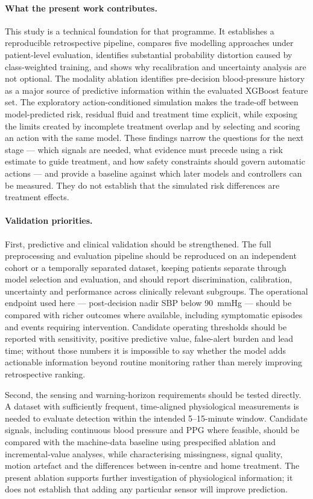 \documentclass{article}
\begin{document}
\paragraph{What the present work contributes.} This study is a technical foundation for that programme. It establishes a
reproducible retrospective pipeline, compares five modelling approaches under patient-level evaluation, identifies substantial
probability distortion caused by class-weighted training, and shows why recalibration and uncertainty analysis are not optional.
The modality ablation identifies pre-decision blood-pressure history as a major source of predictive information within the
evaluated XGBoost feature set. The exploratory action-conditioned simulation makes the trade-off between model-predicted risk,
residual fluid and treatment time explicit, while exposing the limits created by incomplete treatment overlap and by selecting
and scoring an action with the same model. These findings narrow the questions for the next stage --- which signals are needed,
what evidence must precede using a risk estimate to guide treatment, and how safety constraints should govern automatic
actions --- and provide a baseline against which later models and controllers can be measured. They do not establish that the
simulated risk differences are treatment effects.

\paragraph{Validation priorities.} First, predictive and clinical validation should be strengthened. The full preprocessing and
evaluation pipeline should be reproduced on an independent cohort or a temporally separated dataset, keeping patients separate
through model selection and evaluation, and should report discrimination, calibration, uncertainty and performance across
clinically relevant subgroups. The operational endpoint used here --- post-decision nadir SBP below 90~mmHg --- should be
compared with richer outcomes where available, including symptomatic episodes and events requiring intervention. Candidate
operating thresholds should be reported with sensitivity, positive predictive value, false-alert burden and lead time; without
those numbers it is impossible to say whether the model adds actionable information beyond routine monitoring rather than
merely improving retrospective ranking.

Second, the sensing and warning-horizon requirements should be tested directly. A dataset with sufficiently frequent,
time-aligned physiological measurements is needed to evaluate detection within the intended 5--15-minute window. Candidate
signals, including continuous blood pressure and PPG where feasible, should be compared with the machine-data baseline using
prespecified ablation and incremental-value analyses, while characterising missingness, signal quality, motion artefact and
the differences between in-centre and home treatment. The present ablation supports further investigation of physiological
information; it does not establish that adding any particular sensor will improve prediction.
\end{document}
